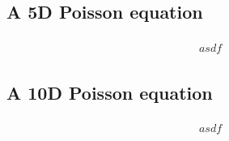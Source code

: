 \subsection{A 5D Poisson equation}

\begin{align}
    \begin{split}
        asdf
    \end{split}
\end{align}

\subsection{A 10D Poisson equation}

\begin{align}
    \begin{split}
        asdf
    \end{split}
\end{align}

